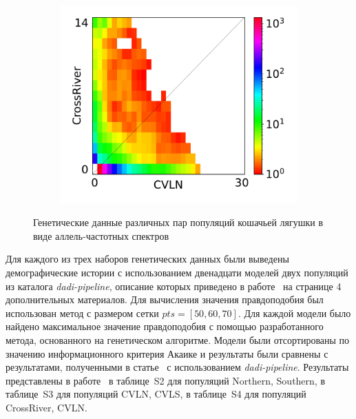 \begin{figure}[ht]
\begin{subfigure}[b]{.33\textwidth}
    \label{fig:part2:experiments:frog:data_2}
    \end{subfigure}%
    \begin{subfigure}[b]{.33\textwidth}
    \includegraphics[width=\textwidth]{images_experiments/gaboon_forest_frog/dadi_2pops_CrossRiver_CVLN_snps.pdf}
    \label{fig:part2:experiments:frog:data_3}
    \end{subfigure}
    \caption{Генетические данные различных пар популяций кошачьей лягушки в виде аллель-частотных спектров}
    \label{fig:part2:experiments:frog:data}
\end{figure}

Для каждого из трех наборов генетических данных были выведены демографические истории с использованием двенадцати моделей двух популяций из каталога \textit{dadi-pipeline}, описание которых приведено в работе~\cite{noskova2020gadma} на странице 4 дополнительных материалов.
Для вычисления значения правдоподобия был использован метод \dadi с размером сетки $pts=[50,60,70]$.
Для каждой модели было найдено максимальное значение правдоподобия с помощью разработанного метода, основанного на генетическом алгоритме.
Модели были отсортированы по значению информационного критерия Акаике и результаты были сравнены с результатами, полученными в статье~\cite{portik2017evaluating} с использованием \textit{dadi-pipeline}.
Результаты представлены в работе~\cite{noskova2020gadma} в таблице~S2 для популяций Northern, Southern, в таблице~S3 для популяций CVLN, CVLS, в таблице~S4 для популяций CrossRiver, CVLN.

